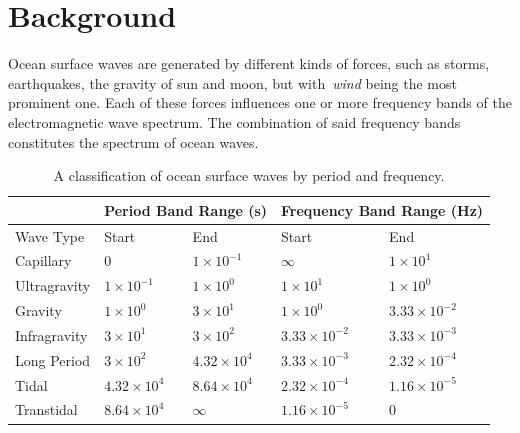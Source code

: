 

\renewcommand{\Re}{\mathcal{R}}
\renewcommand{\Im}{\mathcal{I}} 
%
\chapter{Background}
\label{ch:background}
%
Ocean surface waves are generated by different kinds of forces, such as 
storms, earthquakes, the gravity of sun and moon, but with~\emph{wind} being
the most prominent one. Each of these forces influences one or more frequency
bands of the electromagnetic wave spectrum. The combination of said frequency
bands constitutes the spectrum of ocean waves.
%
\begin{table}[h]
\begin{tabularx}{\textwidth}{X | X X | X X }
  \cline{2-5}
  & \multicolumn{2}{c}{Period Band Range (\si{\second})} \vline & \multicolumn{2}{c}{Frequency Band Range (\si{\hertz})} \\
  \hline
  Wave Type & Start & End & Start & End \\
 \hline
  Capillary    & $0$                & $1\times10^{-1}$   & $\infty$            & $1\times10^1$ \\
  Ultragravity & $1\times10^{-1}$   & $1\times10^{0}$    & $1\times10^1$       & $1\times10^0$ \\
  Gravity      & $1\times10^{0}$    & $3\times10^{1}$    & $1\times10^0$       & $3.33\times10^{-2}$ \\
  Infragravity & $3\times10^{1}$    & $3\times10^{2}$    & $3.33\times10^{-2}$ & $3.33\times10^{-3}$ \\
  Long Period  & $3\times10^{2}$    & $4.32\times10^{4}$ & $3.33\times10^{-3}$ & $2.32\times10^{-4}$ \\
  Tidal        & $4.32\times10^{4}$ & $8.64\times10^{4}$ & $2.32\times10^{-4}$ & $1.16\times10^{-5}$ \\
  Transtidal   & $8.64\times10^{4}$ & $\infty$           & $1.16\times10^{-5}$ & $0$
\end{tabularx}
\caption{A classification of ocean surface waves by period and frequency.}
\label{tab:ocean_wave_period}
\end{table}
%

